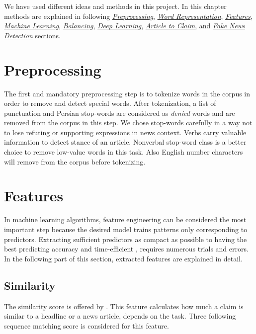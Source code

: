 We have used different ideas and methods in this project. In this chapter methods are explained in following 
\textit{\hyperref[mth:preproces]{Preprocessing}}, 
\textit{\hyperref[mth:wordrep]{Word Representation}}, 
\textit{\hyperref[mth:features]{Features}}, 
\textit{\hyperref[mth:ml]{Machine Learning}}, 
\textit{\hyperref[mth:balance]{Balancing}}, 
\textit{\hyperref[mth:dl]{Deep Learning}}, 
\textit{\hyperref[mth:a2c]{Article to Claim}}, and 
\textit{\hyperref[mth:fn]{Fake News Detection}} sections.

\section{Preprocessing}
\label{mth:preproces}
The first and mandatory preprocessing step is to tokenize words in the corpus in order to remove and detect special words. After tokenization, a list of punctuation and Persian stop-words are considered as \textit{denied} words and are removed from the corpus in this step. We chose stop-words carefully in a way not to lose refuting or supporting expressions in news context. Verbs carry valuable information to detect stance of an article. Nonverbal stop-word class is a better choice to remove low-value words in this task. Also English number characters will remove from the corpus before tokenizing. 

\section{Features}
\label{mth:features}
In machine learning algorithms, feature engineering can be considered the most important step because the desired model trains patterns only corresponding to predictors. Extracting sufficient predictors as compact as possible to having the best predicting accuracy and time-efficient	, requires numerous trials and errors. In the following part of this section, extracted features are explained in detail.

\subsection{Similarity}
The similarity score is offered by \cite{stance_persian}. This feature calculates how much a claim is similar to a headline or a news article, depends on the task. Three following sequence matching score is considered for this feature.

